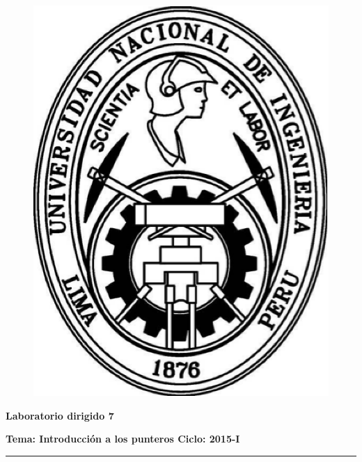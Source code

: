 \documentclass[11pt,a4paper]{article}
\begin{document}
\begin{center}
\begin{figure}[ht!]
\begin{minipage}[c]{0.2\linewidth}
\includegraphics[scale=0.25]{EscudoUNI.eps}
\end{minipage}
\hfill{}
\begin{minipage}{0,8\columnwidth}
\centering{}
\end{minipage}
\end{figure}
\end{center}
\vspace*{-0.50cm}
\noindent

\begin{center}
\textbf{\Large Laboratorio dirigido 7}
\end{center}
\textbf{Tema: Introducci\'on a los punteros \hfill Ciclo: 2015-I}
\noindent
\rule{\textwidth}{2pt}
\newline
\end{document}
